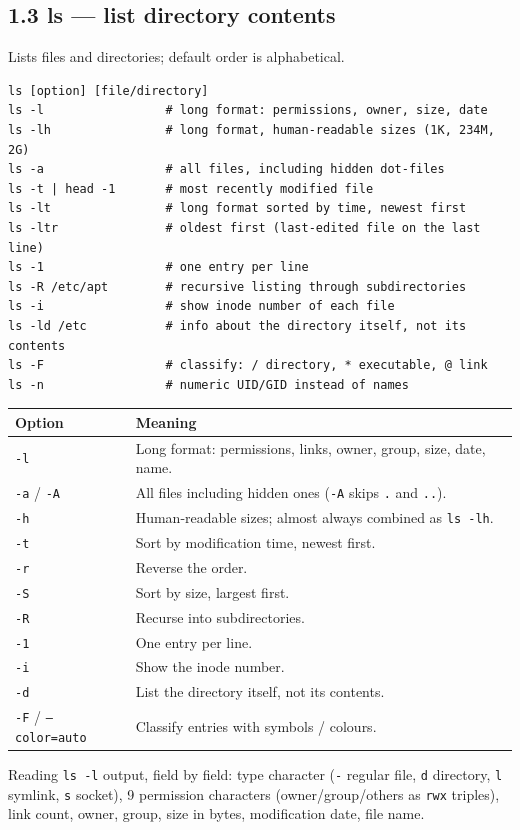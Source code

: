 \documentclass[11pt,a4paper]{article}
\newcommand{\cmd}[1]{\texttt{#1}}
\begin{document}
\subsection{1.3 ls --- list directory contents}
Lists files and directories; default order is alphabetical.
\begin{lstlisting}
ls [option] [file/directory]
ls -l                 # long format: permissions, owner, size, date
ls -lh                # long format, human-readable sizes (1K, 234M, 2G)
ls -a                 # all files, including hidden dot-files
ls -t | head -1       # most recently modified file
ls -lt                # long format sorted by time, newest first
ls -ltr               # oldest first (last-edited file on the last line)
ls -1                 # one entry per line
ls -R /etc/apt        # recursive listing through subdirectories
ls -i                 # show inode number of each file
ls -ld /etc           # info about the directory itself, not its contents
ls -F                 # classify: / directory, * executable, @ link
ls -n                 # numeric UID/GID instead of names
\end{lstlisting}
\begin{center}
\small
\begin{tabularx}{\textwidth}{lX}
\toprule
Option & Meaning \\
\midrule
\cmd{-l} & Long format: permissions, links, owner, group, size, date, name. \\
\cmd{-a} / \cmd{-A} & All files including hidden ones (\cmd{-A} skips \cmd{.} and \cmd{..}). \\
\cmd{-h} & Human-readable sizes; almost always combined as \cmd{ls -lh}. \\
\cmd{-t} & Sort by modification time, newest first. \\
\cmd{-r} & Reverse the order. \\
\cmd{-S} & Sort by size, largest first. \\
\cmd{-R} & Recurse into subdirectories. \\
\cmd{-1} & One entry per line. \\
\cmd{-i} & Show the inode number. \\
\cmd{-d} & List the directory itself, not its contents. \\
\cmd{-F} / \cmd{--color=auto} & Classify entries with symbols / colours. \\
\bottomrule
\end{tabularx}
\end{center}
Reading \cmd{ls -l} output, field by field: type character (\cmd{-} regular file, \cmd{d} directory, \cmd{l} symlink, \cmd{s} socket), 9 permission characters (owner/group/others as \cmd{rwx} triples), link count, owner, group, size in bytes, modification date, file name.
\end{document}
